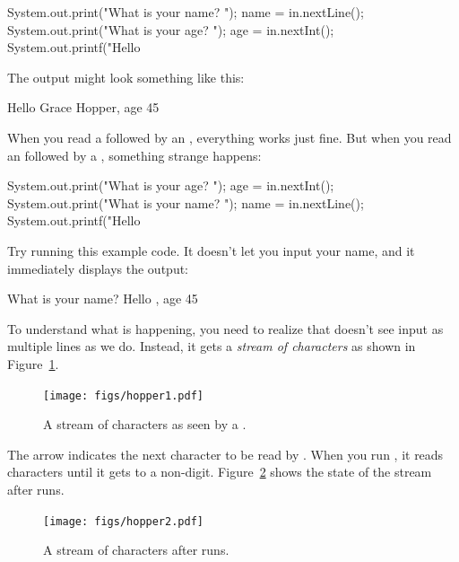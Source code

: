 \begin{code}
System.out.print("What is your name? ");
name = in.nextLine();
System.out.print("What is your age? ");
age = in.nextInt();
System.out.printf("Hello %
\end{code}

The output might look something like this:

\begin{stdout}
Hello Grace Hopper, age 45
\end{stdout}

When you read a  followed by an , everything works just fine.
But when you read an  followed by a , something strange happens:

\begin{code}
System.out.print("What is your age? ");
age = in.nextInt();
System.out.print("What is your name? ");
name = in.nextLine();
System.out.printf("Hello %
\end{code}

Try running this example code.
It doesn't let you input your name, and it immediately displays the output:

\begin{stdout}
What is your name? Hello , age 45
\end{stdout}

To understand what is happening, you need to realize that  doesn't see input as multiple lines as we do.
Instead, it gets a {\em stream of characters} as shown in Figure~\ref{fig.hopper1}.

\begin{figure}[!ht]
\begin{center}
\texttt{[image: figs/hopper1.pdf]}
\caption{A stream of characters as seen by a .}
\label{fig.hopper1}
\end{center}
\end{figure}


The arrow indicates the next character to be read by .
When you run , it reads characters until it gets to a non-digit.
Figure~\ref{fig.hopper2} shows the state of the stream after  runs.

\begin{figure}[!ht]
\begin{center}
\texttt{[image: figs/hopper2.pdf]}
\caption{A stream of characters after  runs.}
\label{fig.hopper2}
\end{center}
\end{figure}

